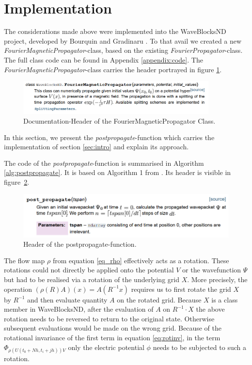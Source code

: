 \documentclass{article}
\begin{document}
\section{Implementation}
The considerations made above were implemented into the WaveBlocksND project, developed by Bourquin and Gradinaru \cite{waveblocksnd}. To that avail we created a new \emph{FourierMagneticPropagator}-class, based on the existing \emph{FourierPropagator}-class. The full class code can be found in Appendix \ref{appendix:code}.
The \emph{FourierMagneticPropagator}-class carries the header portrayed in figure \ref{fig:doc_fmp}.
\begin{figure}[h]
  \centering
  \includegraphics[width = 0.9\textwidth]{graphics/doc_fmp.PNG}
  \caption{Documentation-Header of the FourierMagneticPropagator Class.}
  \label{fig:doc_fmp}
\end{figure}

In this section, we present the \emph{postpropagate}-function which carries the implementation of section \ref{sec:intro} and explain its approach. \newline

The code of the \emph{postpropagate}-function is summarised in Algorithm \ref{alg:postpropagate}. It is based on Algorithm 1 from \cite{paper_orvg}. Its header is visible in figure~\ref{fig:pp}.
\begin{figure}[ht]
  \centering
  \includegraphics[width = 0.9 \textwidth]{graphics/doc_postpropagate.PNG}
  \caption{Header of the postpropagate-function.}
  \label{fig:pp}
\end{figure}

The flow map $\rho$ from equation \ref{eq_rho} effectively acts as a rotation. These rotations could not directly be applied onto the potential $V$ or the wavefunction $\Psi$ but had to be realised via a rotation of the underlying grid $X$. More precisely, the operation $(\rho(R)A)(x) = A(R^{-1}x)$ requires us to first rotate the grid $X$ by $R^{-1}$ and then evaluate quantity $A$ on the rotated grid. Because $X$ is a class member in WaveBlocksND, after the evaluation of $A$ on $R^{-1}\cdot X$ the above rotation needs to be reversed to return to the original state. Otherwise subsequent evaluations would be made on the wrong grid.\newline
Because of the rotational invariance of the first term in equation \ref{eq:rotinv}, in the term $\Phi_{\rho(U(t_0 + Nh, t_i + jh))V}$ only the electric potential $\phi$ needs to be subjected to such a rotation. \newline
\end{document}

